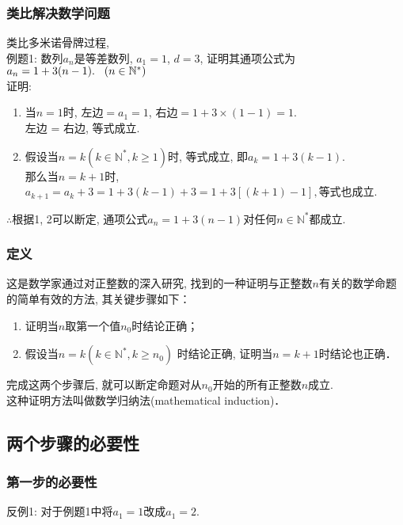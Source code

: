 \documentclass{article}
\begin{document}
\begin{CJK}{UTF8}{gkai}
\subsubsection{类比解决数学问题}
类比多米诺骨牌过程, \\例题1: 数列${a_n}$是等差数列, $a_1 = 1$, $d=3$, 证明其通项公式为$a_n = 1 + 3(n-1).\hspace{3mm}(n \in \mathbb{N}^*)$ 
\\证明: 
\begin{enumerate}[i]
\item 当$n = 1$时, 左边$= a_1 = 1$, 右边$= 1 + 3 \times (1-1) = 1$.\\左边 = 右边, 等式成立.
\item 假设当$n = k (k \in \mathbb{N}^*, k \ge 1)$时, 等式成立, 即$a_k = 1 + 3(k-1).$\\那么当$n = k + 1$时, $a_{k+1} = a_k + 3 = 1 + 3(k-1) + 3 = 1 +3[(k + 1) - 1], $等式也成立.
\end{enumerate}
$\therefore$根据1, 2可以断定, 通项公式$a_n = 1 + 3(n-1)$对任何$n \in \mathbb{N}^*$都成立.

\subsubsection{定义}
这是数学家通过对正整数的深入研究, 找到的一种证明与正整数$n$有关的数学命题的简单有效的方法, 其关键步骤如下：
\begin{enumerate}[i]
\item 证明当$n$取第一个值$n_0$时结论正确；
\item 假设当$n = k (k \in \mathbb{N}^*, k \geq n_0)$ 时结论正确, 证明当$n = k + 1$时结论也正确．
\end{enumerate}
完成这两个步骤后, 就可以断定命题对从$n_0$开始的所有正整数$n$成立.\\这种证明方法叫做数学归纳法(mathematical induction)．

\subsection{两个步骤的必要性}
\subsubsection{第一步的必要性}
反例1: 对于例题1中将$a_1 = 1$改成$a_1 = 2.$

\end{CJK}
\end{document}
